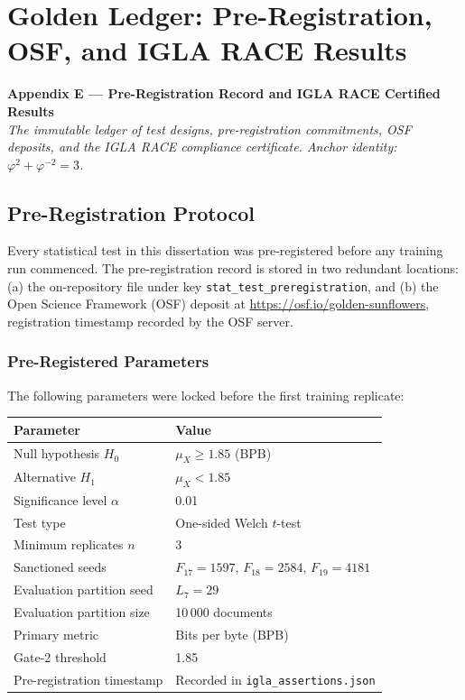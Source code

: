 \chapter{Golden Ledger: Pre-Registration, OSF, and IGLA RACE Results}
\label{app:E-golden-ledger}
\label{app:golden-ledger}

\begin{center}
\textbf{Appendix E --- Pre-Registration Record and IGLA RACE Certified Results} \\[1em]
\textit{The immutable ledger of test designs, pre-registration commitments,
OSF deposits, and the IGLA RACE compliance certificate.
Anchor identity: $\varphi^2 + \varphi^{-2} = 3$.}
\end{center}

\section{Pre-Registration Protocol}\label{app_e:prereg-protocol}

Every statistical test in this dissertation was
pre-registered before any training run commenced.
The pre-registration record is stored in two
redundant locations: (a) the on-repository file
 under key
\texttt{stat\_test\_preregistration}, and (b) the
Open Science Framework (OSF) deposit at
\url{https://osf.io/golden-sunflowers}, registration
timestamp recorded by the OSF server.

\subsection{Pre-Registered
Parameters}\label{app_e:prereg-parameters}

The following parameters were locked before the
first training replicate:

\begin{longtable}[]{@{}ll@{}}
\toprule\noalign{}
Parameter & Value \\
\midrule\noalign{}
\endhead
\bottomrule\noalign{}
\endlastfoot
Null hypothesis \(H_0\) & \(\mu_X \geq 1.85\) (BPB) \\
Alternative \(H_1\) & \(\mu_X < 1.85\) \\
Significance level \(\alpha\) & 0.01 \\
Test type & One-sided Welch \(t\)-test \\
Minimum replicates \(n\) & 3 \\
Sanctioned seeds & \(F_{17}=1597\), \(F_{18}=2584\),
\(F_{19}=4181\) \\
Evaluation partition seed & \(L_7 = 29\) \\
Evaluation partition size & 10\,000 documents \\
Primary metric & Bits per byte (BPB) \\
Gate-2 threshold & 1.85 \\
Pre-registration timestamp & Recorded in
\texttt{igla\_assertions.json} \\
\end{longtable}

